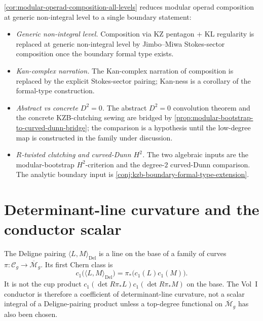 \begin{remark}
\label{rem:what-closes}
\autoref{cor:modular-operad-composition-all-levels} reduces
modular operad composition at generic non-integral level to a
single boundary statement:
\begin{itemize}
 \item \emph{Generic non-integral level.} Composition via KZ
 pentagon + KL regularity is replaced at generic non-integral
 level by Jimbo--Miwa Stokes-sector composition once the
 boundary formal type exists.
 \item \emph{Kan-complex narration.} The Kan-complex narration of
 composition is replaced by the explicit Stokes-sector pairing;
 Kan-ness is a corollary of the formal-type construction.
 \item \emph{Abstract vs concrete $D^2=0$.} The abstract
 \(D^{2}=0\) convolution theorem and the concrete KZB-clutching
 sewing are bridged by
 \autoref{prop:modular-bootstrap-to-curved-dunn-bridge}; the
 comparison is a hypothesis until the low-degree map is constructed
 in the family under discussion.
 \item \emph{$R$-twisted clutching and curved-Dunn $H^2$.} The two
 algebraic inputs are the modular-bootstrap \(H^{2}\)-criterion and
 the degree-\(2\) curved-Dunn comparison. The analytic boundary
 input is \autoref{conj:kzb-boundary-formal-type-extension}.
\end{itemize}
\end{remark}

\section{Determinant-line curvature and the conductor scalar}
\label{sec:chiral-deligne-pairing}

The Deligne pairing \(\langle L, M\rangle_{\mathrm{Del}}\)
is a line on the base of a family of curves
\(\pi : \mathcal{C}_{g} \to \overline{\mathcal{M}}_{g}\). Its first
Chern class is
\[
 c_{1}\bigl(\langle L,M\rangle_{\mathrm{Del}}\bigr)
 =
 \pi_{*}\bigl(c_{1}(L)c_{1}(M)\bigr).
\]
It is not the cup product
\(c_{1}(\det R\pi_{*}L)c_{1}(\det R\pi_{*}M)\) on the base. The
Vol~I conductor is therefore a coefficient of determinant-line
curvature, not a scalar integral of a Deligne-pairing product unless
a top-degree functional on \(\overline{\mathcal M}_{g}\) has also
been chosen.

